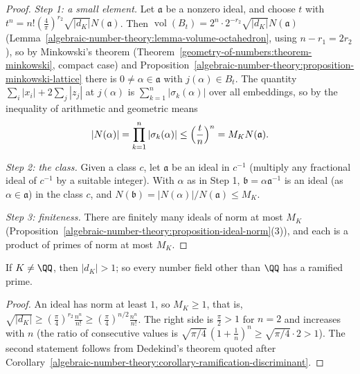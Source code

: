 \begin{proof}
\emph{Step 1: a small element.} Let $\mathfrak{a}$ be a nonzero ideal, and choose $t$ with $t^n = n!(\frac4\pi)^{r_2}\sqrt{|d_K|}N(\mathfrak{a})$. Then
$\operatorname{vol}(B_t) = 2^n \cdot 2^{-r_2}\sqrt{|d_K|}N(\mathfrak{a})$ (Lemma~\ref{algebraic-number-theory:lemma-volume-octahedron}, using $n - r_1 = 2r_2$), so by Minkowski's theorem
(Theorem~\ref{geometry-of-numbers:theorem-minkowski}, compact case) and Proposition~\ref{algebraic-number-theory:proposition-minkowski-lattice} there is $0 \neq \alpha \in \mathfrak{a}$ with $j(\alpha) \in B_t$. The
quantity $\sum_i|x_i| + 2\sum_j|z_j|$ at $j(\alpha)$ is $\sum_{k=1}^n|\sigma_k(\alpha)|$ over all embeddings, so by the inequality of arithmetic and geometric means
\[
|N(\alpha)| = \prod_{k=1}^n|\sigma_k(\alpha)| \leq \Bigl(\frac tn\Bigr)^n = M_KN(\mathfrak{a}).
\]

\emph{Step 2: the class.} Given a class $c$, let $\mathfrak{a}$ be an ideal in $c^{-1}$ (multiply any fractional ideal of $c^{-1}$ by a suitable integer). With $\alpha$ as in Step 1,
$\mathfrak{b} = \alpha\mathfrak{a}^{-1}$ is an ideal (as $\alpha \in \mathfrak{a}$) in the class $c$, and $N(\mathfrak{b}) = |N(\alpha)|/N(\mathfrak{a}) \leq M_K$.

\emph{Step 3: finiteness.} There are finitely many ideals of norm at most $M_K$ (Proposition~\ref{algebraic-number-theory:proposition-ideal-norm}(3)), and each is a product of primes of norm at most $M_K$.
\end{proof}

\begin{corollary}[Minkowski]\label{algebraic-number-theory:corollary-discriminant-bound}
If $K \neq \QQ$, then $|d_K| > 1$; so every number field other than $\QQ$ has a ramified prime.
\end{corollary}

\begin{proof}
An ideal has norm at least $1$, so $M_K \geq 1$, that is, $\sqrt{|d_K|} \geq (\frac\pi4)^{r_2}\frac{n^n}{n!} \geq (\frac\pi4)^{n/2}\frac{n^n}{n!}$. The right side is $\frac{\pi}{2} > 1$ for $n = 2$ and increases
with $n$ (the ratio of consecutive values is $\sqrt{\pi/4}\,(1 + \frac1n)^n \geq \sqrt{\pi/4} \cdot 2 > 1$). The second statement follows from Dedekind's theorem quoted after
Corollary~\ref{algebraic-number-theory:corollary-ramification-discriminant}.
\end{proof}

